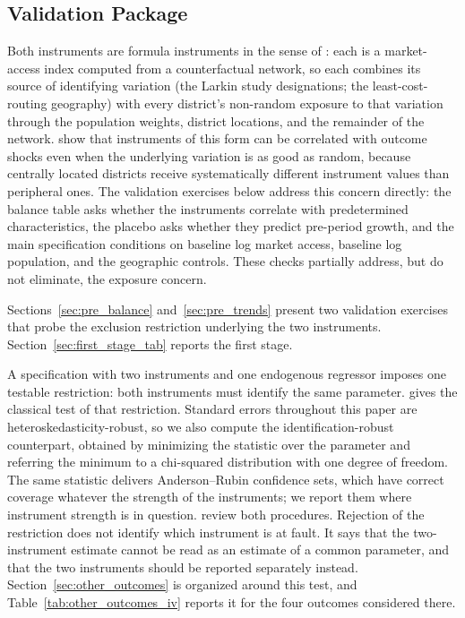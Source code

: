 \subsection{Validation Package}

Both instruments are formula instruments in the sense of
\citet{borusyakhull2023}: each is a market-access index computed from
a counterfactual network, so each combines its source of
identifying variation (the Larkin study designations; the
least-cost-routing geography) with every district's non-random
exposure to that variation through the population weights, district
locations, and the remainder of the network.
\citet{borusyakhull2023} show that instruments of this form can be
correlated with outcome shocks even when the underlying variation is
as good as random, because centrally located districts receive
systematically different instrument values than peripheral ones. The
validation exercises below address this concern directly: the balance
table asks whether the instruments correlate with predetermined
characteristics, the placebo asks whether they predict pre-period
growth, and the main specification conditions on baseline log market
access, baseline log population, and the geographic controls. These
checks partially address, but do not eliminate, the exposure concern.

Sections~\ref{sec:pre_balance} and~\ref{sec:pre_trends} present two
validation exercises that probe the exclusion restriction underlying
the two instruments. Section~\ref{sec:first_stage_tab} reports the
first stage.

A specification with two instruments and one endogenous regressor
imposes one testable restriction: both instruments must identify the
same parameter. \citet{sargan1958} gives the classical test of that
restriction. Standard errors throughout this paper are
heteroskedasticity-robust, so we also compute the
identification-robust counterpart, obtained by minimizing the
\citet{andersonrubin1949} statistic over the parameter and referring
the minimum to a chi-squared distribution with one degree of freedom.
The same statistic delivers Anderson--Rubin confidence sets, which
have correct coverage whatever the strength of the instruments; we
report them where instrument strength is in question.
\citet{andrewsstocksun2019} review both procedures. Rejection of the
restriction does not identify which instrument is at fault. It says
that the two-instrument estimate cannot be read as an estimate of a
common parameter, and that the two instruments should be reported
separately instead. Section~\ref{sec:other_outcomes} is organized
around this test, and Table~\ref{tab:other_outcomes_iv} reports it
for the four outcomes considered there.

